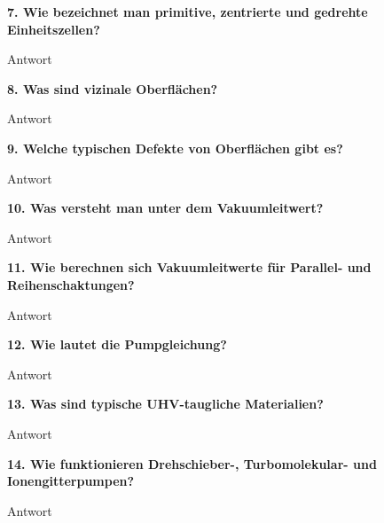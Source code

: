 \noindent\textbf{7. Wie bezeichnet man primitive, zentrierte und gedrehte Einheitszellen?}\\
\begin{addmargin}[25pt]{0pt}
Antwort\\
\end{addmargin}

\noindent\textbf{8. Was sind vizinale Oberflächen?}\\
\begin{addmargin}[25pt]{0pt}
Antwort\\
\end{addmargin}

\noindent\textbf{9. Welche typischen Defekte von Oberflächen gibt es?}\\
\begin{addmargin}[25pt]{0pt}
Antwort\\
\end{addmargin}

\noindent\textbf{10. Was versteht man unter dem Vakuumleitwert?}\\
\begin{addmargin}[25pt]{0pt}
Antwort\\
\end{addmargin}

\noindent\textbf{11. Wie berechnen sich Vakuumleitwerte für Parallel- und Reihenschaktungen? }\\
\begin{addmargin}[25pt]{0pt}
Antwort\\
\end{addmargin}

\noindent\textbf{12. Wie lautet die Pumpgleichung?}\\
\begin{addmargin}[25pt]{0pt}
Antwort\\
\end{addmargin}

\noindent\textbf{13. Was sind typische UHV-taugliche Materialien?}\\
\begin{addmargin}[25pt]{0pt}
Antwort\\
\end{addmargin}

\noindent\textbf{14. Wie funktionieren Drehschieber-, Turbomolekular- und Ionengitterpumpen?}\\
\begin{addmargin}[25pt]{0pt}
Antwort\\
\end{addmargin}

